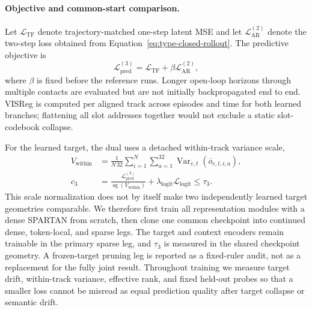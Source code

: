 \paragraph{Objective and common-start comparison.}
Let $\mathcal{L}_{\mathrm{TF}}$ denote trajectory-matched one-step latent MSE and let
$\mathcal{L}^{(2)}_{\mathrm{AR}}$ denote the two-step loss obtained from
Equation~\eqref{eq:type-closed-rollout}.  The predictive objective is
\begin{equation}
    \mathcal{L}^{(3)}_{\mathrm{pred}}
      =\mathcal{L}_{\mathrm{TF}}
       +\beta\mathcal{L}^{(2)}_{\mathrm{AR}},
    \label{eq:fully-visual-predictive-loss}
\end{equation}
where $\beta$ is fixed before the reference runs.  Longer open-loop horizons through multiple
contacts are evaluated but are not initially backpropagated end to end.  VISReg is computed per
aligned track across episodes and time for both learned branches; flattening all slot addresses
together would not exclude a static slot-codebook collapse.

For the learned target, the dual uses a detached within-track variance scale,
\begin{align}
    V_{\mathrm{within}}
      &=\frac{1}{N\,32}\sum_{i=1}^{N}\sum_{a=1}^{32}
        \operatorname{Var}_{e,t}(\overline o_{e,t,i,a}),
        \\
    c_3
      &=\frac{\mathcal{L}^{(3)}_{\mathrm{pred}}}
              {\operatorname{sg}(V_{\mathrm{within}})}
        +\lambda_{\mathrm{logit}}\mathcal{L}_{\mathrm{logit}}
      \leq\tau_3.
    \label{eq:fully-visual-constraint}
\end{align}
This scale normalization does not by itself make two independently learned target geometries
comparable.  We therefore first train all representation modules with a dense SPARTAN from
scratch, then clone one common checkpoint into continued dense, token-local, and sparse legs.
The target and context encoders remain trainable in the primary sparse leg, and $\tau_3$ is
measured in the shared checkpoint geometry.  A frozen-target pruning leg is reported as a
fixed-ruler audit, not as a replacement for the fully joint result.  Throughout training we
measure target drift, within-track variance, effective rank, and fixed held-out probes so that a
smaller loss cannot be misread as equal prediction quality after target collapse or semantic
drift.

